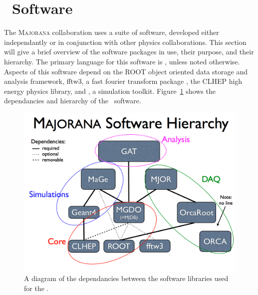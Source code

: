 \documentclass[/main.tex]{subfiles}
\begin{document}
\section{\MJD\ Software} \label{sec:mjsw}
The \textsc{Majorana} collaboration uses a suite of software, developed either independantly or in conjunction with other physics collaborations.
This section will give a brief overview of the software packages in use, their purpose, and their hierarchy.
The primary language for this software is \cpp, unless noted otherwise.
Aspects of this software depend on the ROOT object oriented data storage and analysis framework\cite{rootcern}, fftw3, a fast fourier transform package \cite{fftw3}, the CLHEP high energy physics library\cite{clhep}, and \geant, a simulation toolkit\cite{geant2003}.
Figure~\ref{fig:swhierarchy} shows the dependancies and hierarchy of the \MJD\ software.
\begin{figure}
  \centering
  \includegraphics[width=\textwidth]{SoftwareHierarchy}
  \caption[\MJD\ software hierarchy]{\label{fig:swhierarchy}
    A diagram of the dependancies between the software libraries used for the \MJD.
  }
\end{figure}
\end{document}
